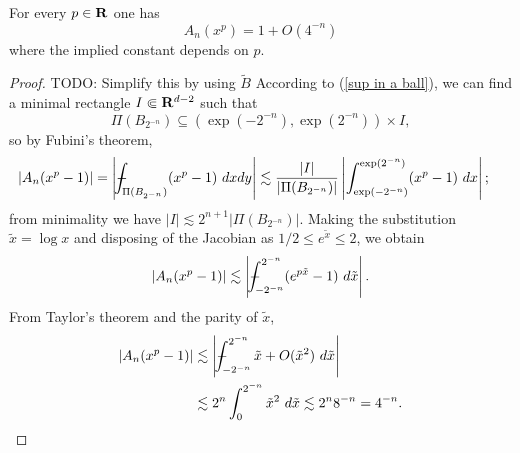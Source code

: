\begin{lemma}\label{average of xp is harmless}
For every $p \in \mathbf{R}$ one has
$$A_n(x^p) = 1 + O(4^{-n})$$
where the implied constant depends on $p$.
\end{lemma}
\begin{proof}
TODO: Simplify this by using $\tilde B$
According to (\ref{sup in a ball}), we can find a minimal rectangle $I \Subset \mathbf{R}^{d - 2}$ such that
$$\Pi(B_{2^{-n}}) \subseteq (\exp(-2^{-n}), \exp(2^{-n})) \times I,$$
so by Fubini's theorem,
\begin{align*}|A_n(x^p - 1)| &= \left|\dashint_{\Pi(B_{2^{-n}})} (x^p - 1) ~dxdy\right| \lesssim \frac{|I|}{|\Pi(B_{2^{-n}})|} \left|\int_{\exp(-2^{-n})}^{\exp(2^{-n})} (x^p - 1)~ dx\right|;
\end{align*}
from minimality we have $|I| \lesssim 2^{n + 1} |\Pi(B_{2^{-n}})|$.
Making the substitution $\tilde x = \log x$ and disposing of the Jacobian as $1/2 \leq e^{\tilde x} \leq 2$, we obtain
$$|A_n(x^p - 1)| \lesssim \left|\dashint_{-2^{-n}}^{2^{-n}} (e^{p\tilde x} - 1) ~d\tilde x\right|.$$
From Taylor's theorem and the parity of $\tilde x$,
\begin{align*}
|A_n(x^p - 1)| &\lesssim \left|\dashint_{-2^{-n}}^{2^{-n}} \tilde x + O(\tilde x^2) ~d\tilde x\right| \\
&\lesssim 2^n \int_0^{2^{-n}} \tilde x^2 ~d\tilde x \lesssim 2^n 8^{-n} = 4^{-n}. \qedhere
\end{align*}
\end{proof}

